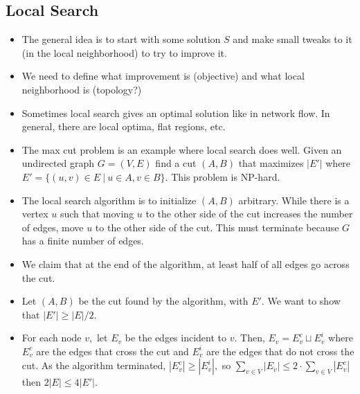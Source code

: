 \documentclass[a4paper,12pt]{article}
\begin{document}
\subsection{Local Search}
\begin{itemize}
    \item The general idea is to start with some solution $S$ and make small tweaks to it (in the local neighborhood) to try to improve it.
    \item We need to define what improvement is (objective) and what local neighborhood is (topology?)
    \item Sometimes local search gives an optimal solution like in network flow. In general, there are local optima, flat regions, etc.
    \item The max cut problem is an example where local search does well. Given an undirected graph $G=(V,E)$ find a cut $(A,B)$ that maximizes $|E'|$ where $E'=\{(u,v)\in E~|~u\in A,v\in B\}.$ This problem is NP-hard.
    \item The local search algorithm is to initialize $(A,B)$ arbitrary. While there is a vertex $u$ such that moving $u$ to the other side of the cut increases the number of edges, move $u$ to the other side of the cut. This must terminate because $G$ has a finite number of edges.
    \item We claim that at the end of the algorithm, at least half of all edges go across the cut.
    \item Let $(A,B)$ be the cut found by the algorithm, with $E'.$ We want to show that $|E'|\geq|E|/2.$
    \item For each node $v,$ let $E_v$ be the edges incident to $v.$ Then, $E_v=E_v^c\sqcup E_v^i$ where $E_v^c$ are the edges that cross the cut and $E_v^i$ are the edges that do not cross the cut. As the algorithm terminated, $|E_v^c|\geq|E_v^i|,$ so $\sum_{v\in V}|E_v|\leq 2\cdot\sum_{v\in V}|E_v^c|$ then $2|E|\leq 4|E'|.$ 
\end{itemize}
\end{document}
